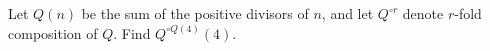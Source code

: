 Let $Q(n)$ be the sum of the positive divisors of $n$, and let $Q^{\circ r}$ denote $r$-fold composition of $Q$. Find $Q^{\circ Q(4)}(4)$.
